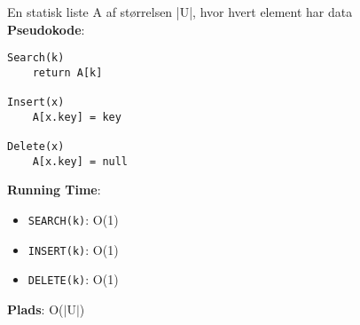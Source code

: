 En statisk liste A af størrelsen |U|, hvor hvert element har data\\
\textbf{Pseudokode}:
\begin{lstlisting}[frame=single, mathescape=true]
Search(k)
	return A[k]

Insert(x)
	A[x.key] = key

Delete(x)
	A[x.key] = null
\end{lstlisting}
\textbf{Running Time}:
\begin{itemize}
	\item \texttt{SEARCH(k)}: O(1)
	\item \texttt{INSERT(k)}: O(1)
	\item \texttt{DELETE(k)}: O(1)
\end{itemize}
\textbf{Plads}: O($|$U$|$)